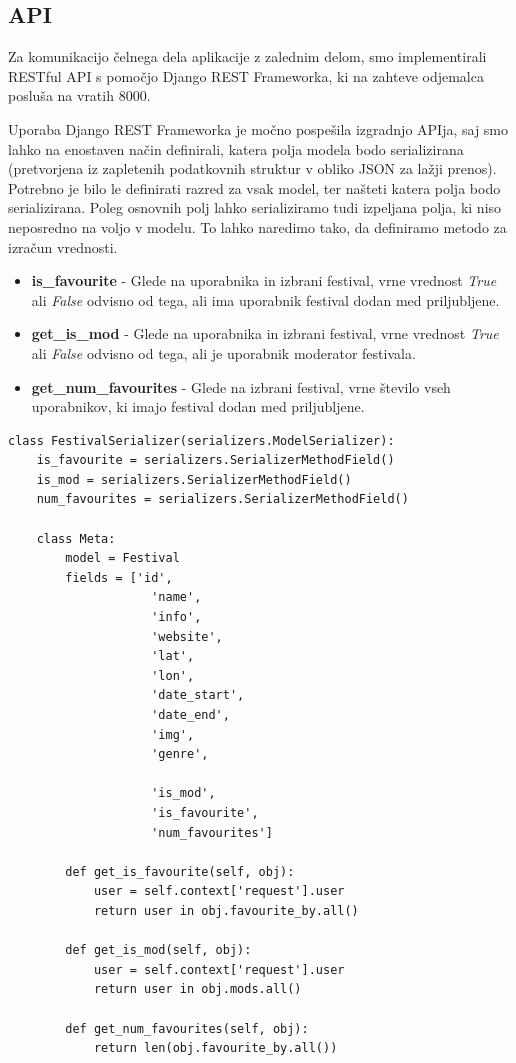 \documentclass[a4paper,12pt,openright]{book}
\begin{document}
\subsection{API}
Za komunikacijo čelnega dela aplikacije z zalednim delom, smo implementirali RESTful API s pomočjo Django REST Frameworka, ki na zahteve odjemalca posluša na vratih 8000.

Uporaba Django REST Frameworka je močno pospešila izgradnjo APIja, saj smo lahko na enostaven način definirali, katera polja modela bodo serializirana (pretvorjena iz zapletenih podatkovnih struktur v obliko JSON za lažji prenos).
Potrebno je bilo le definirati razred za vsak model, ter našteti katera polja bodo serializirana.
Poleg osnovnih polj lahko serializiramo tudi izpeljana polja, ki niso neposredno na voljo v modelu.
To lahko naredimo tako, da definiramo metodo za izračun vrednosti.
\begin{itemize}
    \item \textbf{is\_favourite} - Glede na uporabnika in izbrani festival, vrne vrednost \textit{True} ali \textit{False} odvisno od tega, ali ima uporabnik festival dodan med priljubljene.
    \item \textbf{get\_is\_mod} - Glede na uporabnika in izbrani festival, vrne vrednost \textit{True} ali \textit{False} odvisno od tega, ali je uporabnik moderator festivala.
    \item \textbf{get\_num\_favourites} - Glede na izbrani festival, vrne število vseh uporabnikov, ki imajo festival dodan med priljubljene.
\end{itemize}

\begin{lstlisting}[label=code2,caption=Primer serializacije podatkov za model Festival.,frame=tb,captionpos=b]
class FestivalSerializer(serializers.ModelSerializer):
    is_favourite = serializers.SerializerMethodField()
    is_mod = serializers.SerializerMethodField()
    num_favourites = serializers.SerializerMethodField()

    class Meta:
        model = Festival
        fields = ['id', 
                    'name', 
                    'info', 
                    'website', 
                    'lat', 
                    'lon',
                    'date_start',
                    'date_end',
                    'img',
                    'genre',
                    
                    'is_mod',
                    'is_favourite',
                    'num_favourites']
        
        def get_is_favourite(self, obj):
            user = self.context['request'].user
            return user in obj.favourite_by.all()
        
        def get_is_mod(self, obj):
            user = self.context['request'].user
            return user in obj.mods.all()
        
        def get_num_favourites(self, obj):
            return len(obj.favourite_by.all())
\end{lstlisting}
\end{document}
